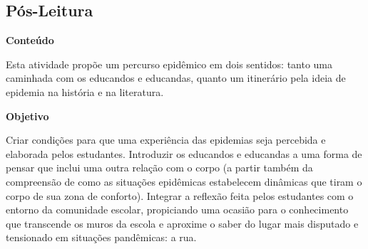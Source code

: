 \documentclass[12pt]{extarticle}
\begin{document}
\subsection{Pós-Leitura}




\textbf{Conteúdo}

Esta atividade propõe um percurso epidêmico em dois sentidos: tanto uma
caminhada com os educandos e educandas, quanto um itinerário pela ideia
de epidemia na história e na literatura.

\textbf{Objetivo}

Criar condições para que uma experiência das epidemias seja percebida e
elaborada pelos estudantes. Introduzir os educandos e educandas a uma
forma de pensar que inclui uma outra relação com o corpo (a partir
também da compreensão de como as situações epidêmicas estabelecem
dinâmicas que tiram o corpo de sua zona de conforto). Integrar a
reflexão feita pelos estudantes com o entorno da comunidade escolar,
propiciando uma ocasião para o conhecimento que transcende os muros da
escola e aproxime o saber do lugar mais disputado e tensionado em
situações pandêmicas: a rua.
\end{document}
